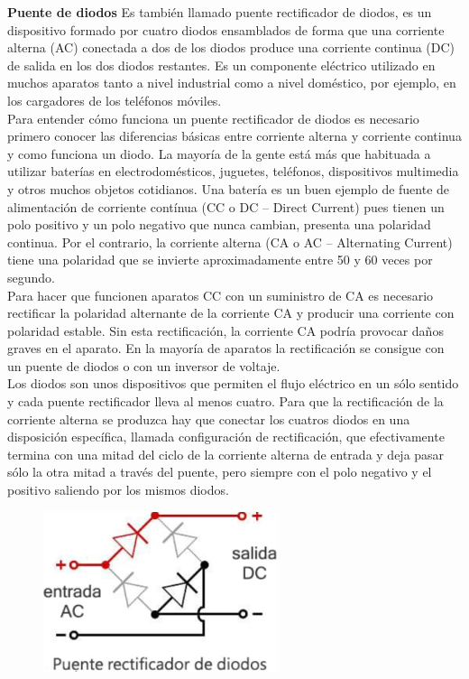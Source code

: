 \documentclass[a4paper,12pt]{report}
\begin{document}
\begin{enumerate}
\textbf{Puente de diodos}
Es también llamado puente rectificador de diodos, es un dispositivo formado por cuatro diodos ensamblados de forma que una corriente alterna (AC) conectada a dos de los diodos produce una corriente continua (DC) de salida en los dos diodos restantes. Es un componente eléctrico utilizado en muchos aparatos tanto a nivel industrial como a nivel doméstico, por ejemplo, en los cargadores de los teléfonos móviles.\\
 Para entender cómo funciona un puente rectificador de diodos es necesario primero conocer las diferencias básicas entre corriente alterna y corriente continua y como funciona un diodo. La mayoría de la gente está más que habituada a utilizar baterías en electrodomésticos, juguetes, teléfonos, dispositivos multimedia y otros muchos objetos cotidianos. Una batería es un buen ejemplo de fuente de alimentación de corriente contínua (CC o DC – Direct Current) pues tienen un polo positivo y un polo negativo que nunca cambian, presenta una polaridad continua. Por el contrario, la corriente alterna (CA o AC – Alternating Current) tiene una polaridad que se invierte aproximadamente entre 50 y 60 veces por segundo.\\
Para hacer que funcionen aparatos CC con un suministro de CA es necesario rectificar la polaridad alternante de la corriente CA y producir una corriente con polaridad estable. Sin esta rectificación, la corriente CA podría provocar daños graves en el aparato. En la mayoría de aparatos la rectificación se consigue con un puente de diodos o con un inversor de voltaje.\\
Los diodos son unos dispositivos que permiten el flujo eléctrico en un sólo sentido y cada puente rectificador lleva al menos cuatro. Para que la rectificación de la corriente alterna se produzca hay que conectar los cuatros diodos en una disposición específica, llamada configuración de rectificación, que efectivamente termina con una mitad del ciclo de la corriente alterna de entrada y deja pasar sólo la otra mitad a través del puente, pero siempre con el polo negativo y el positivo saliendo por los mismos diodos.
\begin{figure}[H]
\centering
\includegraphics[scale=0.5]{sergod1.png}

\end{figure}
\end{enumerate}
\end{document}
